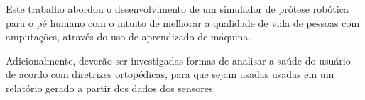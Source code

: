 Este trabalho abordou o desenvolvimento de um simulador de prótese robótica para o pé humano com o intuito de melhorar a qualidade de vida de pessoas com amputações, através do uso de aprendizado de máquina.


% 

% 
Adicionalmente, deverão ser investigadas formas de analisar a saúde do usuário de acordo com diretrizes ortopédicas, para que sejam usadas usadas em um relatório gerado a partir dos dados dos sensores.
